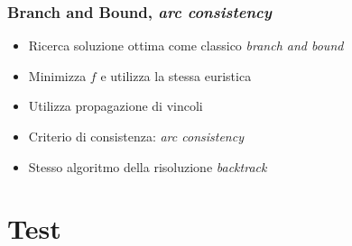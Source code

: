 \documentclass{beamer}
\begin{document}
\begin{frame}
\frametitle{Branch and Bound, \textit{arc consistency}}

\begin{itemize}
	\item Ricerca soluzione ottima come classico \textit{branch and bound}
	\item Minimizza $f$ e utilizza la stessa euristica
	\item Utilizza propagazione di vincoli
	\item Criterio di consistenza: \textit{arc consistency}
	\item Stesso algoritmo della risoluzione \textit{backtrack}
\end{itemize}

\end{frame}

\section{Test}
\end{document}
